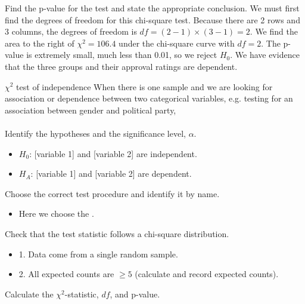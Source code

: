 \begin{examplewrap}
\begin{nexample}{Find the p-value for the test and state the appropriate conclusion.}
We must first find the degrees of freedom for this chi-square test.  Because there are 2 rows and 3 columns, the degrees of freedom is $df=(2-1)\times (3-1) = 2$. We find the area to the right of $\chi^2=106.4$ under the chi-square curve with $df=2$.  The p-value is extremely small, much less than 0.01, so we reject $H_0$.  We have evidence that the three groups and their approval ratings are dependent.  
\end{nexample}
\end{examplewrap}




\begin{onebox}{$\chi^2$ test of independence}
When there is one sample and we are looking for association or dependence between two categorical variables, e.g. testing for an association between gender and political party,
\\
\\
 Identify the hypotheses and the significance level, $\alpha$.  \vspace{-1mm}
\begin{itemize}
\setlength{\itemsep}{0mm}
\item[] $H_0$: [variable 1] and [variable 2] are independent.
\item[] $H_A$: [variable 1] and [variable 2] are dependent.
\end{itemize}
 Choose the correct test procedure and identify it by name.\vspace{-1mm}
\begin{itemize}
\item[]  Here we choose the .
\end{itemize}
 Check that the test statistic follows a chi-square distribution.\vspace{-1mm}
\begin{itemize}
\setlength{\itemsep}{0mm}
\item[] 1. Data come from a single random sample.
\item[] 2. All expected counts are $\ge 5$ (calculate and record expected counts).
\end{itemize}
 Calculate the $\chi^2$-statistic, $df$, and p-value.\vspace{-1mm}  

\end{onebox}
